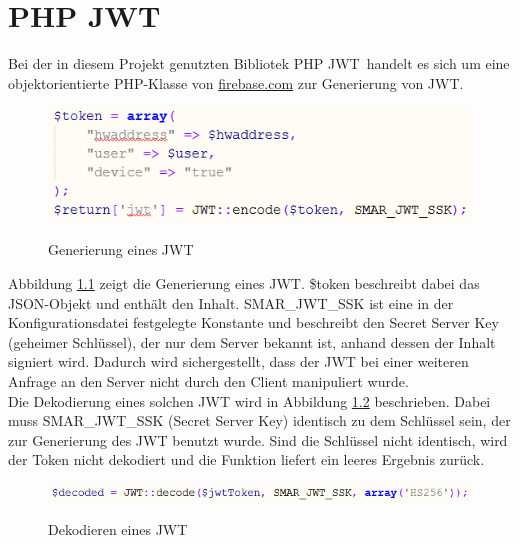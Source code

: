 \chapter{\acs{PHP} \acs{JWT}}
\label{cha:jwt}
\sloppy

Bei der in diesem Projekt genutzten Bibliotek \glqq PHP JWT\grqq\ handelt es sich um eine objektorientierte \ac{PHP}-Klasse von \mbox{\url{firebase.com}} zur Generierung von \acl{JWT}.
\fussy
\begin{figure}[H]
	\centering
	{\includegraphics[scale=1.0]{Bilder/jwt_encode.png}}
	\caption{Generierung eines \acs{JWT}}
	\label{fig:jwt_encode}
\end{figure}

Abbildung \ref{fig:jwt_encode} zeigt die Generierung eines \ac{JWT}. \$token beschreibt dabei das \ac{JSON}-Objekt und enthält den Inhalt. SMAR\_JWT\_SSK ist eine in der Konfigurationsdatei festgelegte Konstante und beschreibt den Secret Server Key (geheimer Schlüssel), der nur dem Server bekannt ist, anhand dessen der Inhalt signiert wird. Dadurch wird sichergestellt, dass der \ac{JWT} bei einer weiteren Anfrage an den Server nicht durch den Client manipuliert wurde.\\

Die Dekodierung eines solchen \acl{JWT} wird in Abbildung \ref{fig:jwt_decode} beschrieben. Dabei muss SMAR\_JWT\_SSK (Secret Server Key) identisch zu dem Schlüssel sein, der zur Generierung des \ac{JWT} benutzt wurde. Sind die Schlüssel nicht identisch, wird der Token nicht dekodiert und die Funktion liefert ein leeres Ergebnis zurück.

\begin{figure}[H]
	\centering
	{\includegraphics[scale=1.0]{Bilder/jwt_decode.png}}
	\caption{Dekodieren eines \acs{JWT}}
	\label{fig:jwt_decode}
\end{figure}

